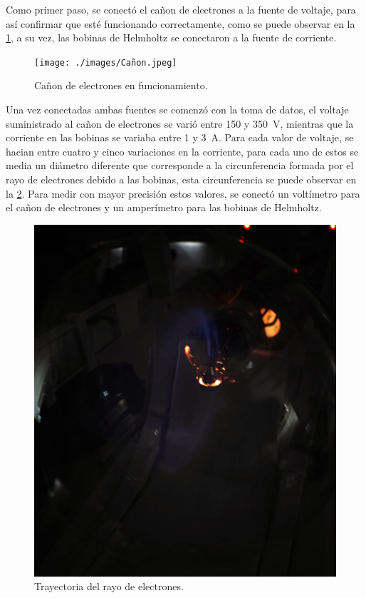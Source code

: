 Como primer paso, se conectó el cañon de electrones a la fuente de voltaje, para
así confirmar que esté funcionando correctamente, como se puede observar en la
\cref{fig:cañon-de-electrones}, a su vez, las bobinas de Helmholtz se
conectaron a la fuente de corriente.

\begin{figure}[htbp!]
  \centering
  \texttt{[image: ./images/Cañon.jpeg]}
  \caption{Cañon de electrones en funcionamiento.}
  \label{fig:cañon-de-electrones}
\end{figure}

Una vez conectadas ambas fuentes se comenzó con la toma de datos, el voltaje
suministrado al cañon de electrones se varió entre 150 y \qty{350}{V},
mientras que la corriente en las bobinas se variaba entre 1 y \qty{3}{A}.
Para cada valor de voltaje, se hacian entre cuatro y cinco variaciones en la
corriente, para cada uno de estos se media un diámetro diferente que corresponde
a la circunferencia formada por el rayo de electrones debido a las bobinas,
esta circunferencia se puede observar en la \cref{fig:rayo-de-electrones}.
Para medir con mayor precisión estos valores, se conectó un voltímetro para el
cañon de electrones y un amperímetro para las bobinas de Helmholtz.

\begin{figure}[htbp!]
    \centering
    \includegraphics[width=0.8\linewidth]{./images/rayo-de-electrones.jpeg}
    \caption{Trayectoria del rayo de electrones.}
  \label{fig:rayo-de-electrones}
\end{figure}

